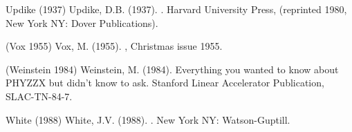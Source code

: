 \item[Up] Updike (1937)
 Updike, D.B. (1937). .
Harvard University Press,
(reprinted 1980, New York NY: Dover Publications).

\item[Vox] (Vox 1955)
 Vox, M. (1955). ,
Christmas issue 1955.

\item[Phyzzx]  (Weinstein 1984)
 Weinstein, M. (1984). 
{\italic Everything you wanted to know about PHYZZX but didn't know to ask}.
Stanford Linear Accelerator Publication, SLAC-TN-84-7.

\item[White:line] White (1988)
White, J.V. (1988). .
New York NY: Watson-Guptill.

\bibliographystop

\endinput
